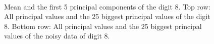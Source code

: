 \documentclass[a4paper, 12pt, titlepage]{article}
\begin{document}
\begin{figure}[H]
	\centering
	\\
	\caption{\protect{} Mean and the first 5 principal components of the digit 8. \protect{} Top row: All principal values and the 25 biggest principal values of the digit 8. Bottom row: All principal values and the 25 biggest principal values of the noisy data of digit 8.}
\end{figure}
\end{document}

